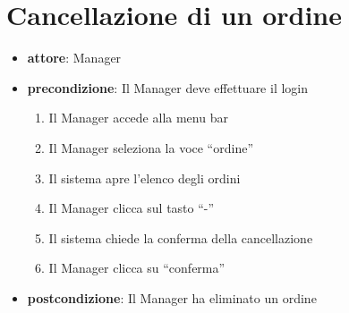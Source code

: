 \section{Cancellazione di un ordine}
\begin{itemize}
    \item \textbf{attore}: Manager
    \item \textbf{precondizione}: Il Manager deve effettuare il login

    \begin{enumerate}
        \item Il Manager accede alla menu bar
        \item Il Manager seleziona la voce “ordine”
        \item Il sistema apre l’elenco degli ordini
        \item Il Manager clicca sul tasto “-”
        \item Il sistema chiede la conferma della cancellazione
        \item Il Manager clicca su “conferma”
    \end{enumerate}

    \item \textbf{postcondizione}: Il Manager ha eliminato un ordine
\end{itemize}


